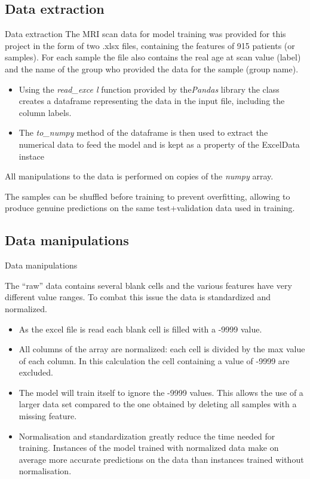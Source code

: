 \documentclass{beamer}
\begin{document}
\subsection*{Data extraction}
\begin{frame}{Data extraction}
The MRI scan data for model training was provided for this project in the form of two .xlsx files, containing the features of 915 patients (or samples). For each sample the file also contains the real age at scan value (label) and the name of the group who provided the data for the sample (group name).
\begin{itemize}
\item Using the \emph{ read\_exce l} function provided by the\emph{Pandas} library the class creates a dataframe representing the data in the input file, including  the column labels. 

\item The \emph{ to\_numpy} method of the dataframe is then used to extract the numerical data to feed the model and is kept as a property of the ExcelData instace
\end{itemize}
All manipulations to the data is performed on copies of the \emph{numpy} array.

The samples can be shuffled before training to prevent overfitting, allowing to produce genuine predictions on the same test+validation data used in training.
\end{frame}

\subsection{Data manipulations}
\begin{frame}{Data manipulations}

The ``raw'' data contains several blank cells and the various features have very different value ranges. To combat this issue the data is standardized and normalized. 

\begin{itemize}
\item As the excel file is read each blank cell is filled with a -9999 value. 
\item All columns of the array are normalized: each cell is divided by the max value of each column. In this calculation the cell containing a value of -9999 are excluded. 
\item The model will train itself to ignore the -9999 values. This allows the use of a larger data set compared to the one obtained by deleting all samples with a missing feature.
\item Normalisation and standardization greatly reduce the time needed for training. Instances of the model trained with normalized data make on average more accurate predictions on the data than instances trained without normalisation.
\end{itemize}

\end{frame}
\end{document}
